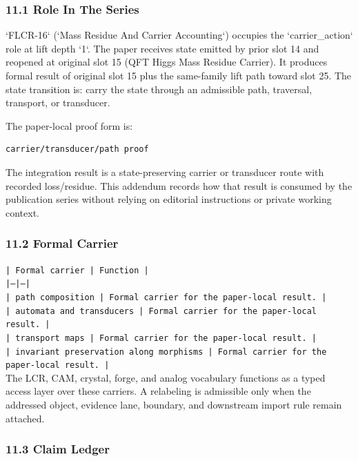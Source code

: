 \documentclass[11pt]{article}
\begin{document}
\subsubsection*{11.1 Role In The Series}

`FLCR-16` (`Mass Residue And Carrier Accounting`) occupies the `carrier\_action` role at lift depth `1`.
The paper receives state emitted by prior slot 14 and reopened at original slot 15 (QFT Higgs Mass Residue Carrier). It produces formal result of original slot 15 plus the same-family lift path toward slot 25. The state transition is:
carry the state through an admissible path, traversal, transport, or transducer.

The paper-local proof form is:

\begin{verbatim}
carrier/transducer/path proof
\end{verbatim}

The integration result is a state-preserving carrier or transducer route with recorded loss/residue. This addendum records how that result is
consumed by the publication series without relying on editorial instructions or
private working context.

\subsubsection*{11.2 Formal Carrier}

\noindent\texttt{| Formal carrier | Function |}\\
\noindent\texttt{|---|---|}\\
\noindent\texttt{| path composition | Formal carrier for the paper-local result. |}\\
\noindent\texttt{| automata and transducers | Formal carrier for the paper-local result. |}\\
\noindent\texttt{| transport maps | Formal carrier for the paper-local result. |}\\
\noindent\texttt{| invariant preservation along morphisms | Formal carrier for the paper-local result. |}\\

The LCR, CAM, crystal, forge, and analog vocabulary functions as a typed access
layer over these carriers. A relabeling is admissible only when the addressed
object, evidence lane, boundary, and downstream import rule remain attached.

\subsubsection*{11.3 Claim Ledger}
\end{document}
